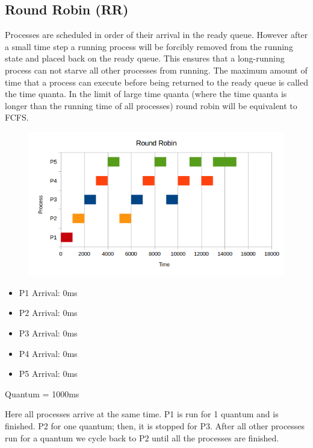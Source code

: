 \subsection{Round Robin (RR)}

Processes are scheduled in order of their arrival in the ready queue. However after a small time step a running process will be forcibly removed from the running state and placed back on the ready queue. This ensures that a long-running process can not starve all other processes from running. The maximum amount of time that a process can execute before being returned to the ready queue is called the time quanta. In the limit of large time quanta (where the time quanta is longer than the running time of all processes) round robin will be equivalent to FCFS.

\begin{figure}[htbp]
\centering
\includegraphics[width=\textwidth]{scheduling/images/rr.png}
\caption{}
\end{figure}

\begin{itemize}
\tightlist
\item
  P1 Arrival: 0ms
\item
  P2 Arrival: 0ms
\item
  P3 Arrival: 0ms
\item
  P4 Arrival: 0ms
\item
  P5 Arrival: 0ms
\end{itemize}

Quantum = 1000ms

Here all processes arrive at the same time. P1 is run for 1 quantum and is finished. P2 for one quantum; then, it is stopped for P3. After all other processes run for a quantum we cycle back to P2 until all the processes are finished.

